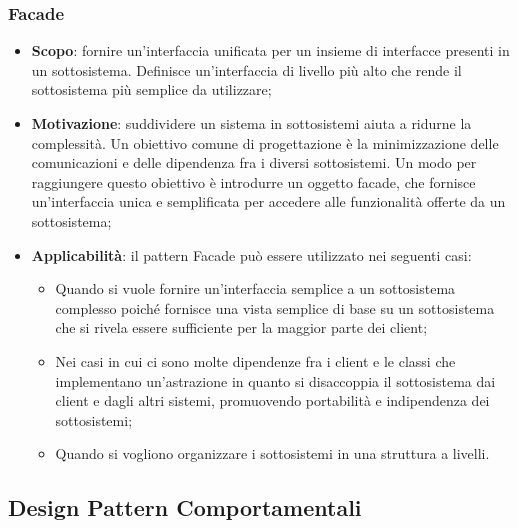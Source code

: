 		\subsubsection{Facade}
		\begin{itemize}
		\item \textbf{Scopo}: fornire un’interfaccia unificata per un insieme di interfacce presenti in un
sottosistema. Definisce un’interfaccia di livello più alto che rende il sottosistema più semplice da utilizzare;
		\item \textbf{Motivazione}: suddividere un sistema in sottosistemi aiuta a ridurne la complessità.
Un obiettivo comune di progettazione è la minimizzazione delle comunicazioni e delle dipendenza fra i diversi sottosistemi. Un modo per raggiungere questo obiettivo è introdurre un oggetto facade, che fornisce un’interfaccia unica e semplificata per accedere alle funzionalità offerte da un sottosistema;
		\item \textbf{Applicabilità}: il pattern Facade può essere utilizzato nei seguenti casi:
		\begin{itemize}
		\item Quando si vuole fornire un’interfaccia semplice a un sottosistema complesso poiché fornisce una vista semplice di base su un sottosistema che si rivela essere sufficiente per la maggior parte dei client;
		\item Nei casi in cui ci sono molte dipendenze fra i client e le classi che implementano un’astrazione in quanto si disaccoppia il sottosistema dai client e dagli altri sistemi, promuovendo portabilità e indipendenza dei sottosistemi;
		\item Quando si vogliono organizzare i sottosistemi in una struttura a livelli.
		\end{itemize}

		\end{itemize}
	
	\subsection{Design Pattern Comportamentali}
